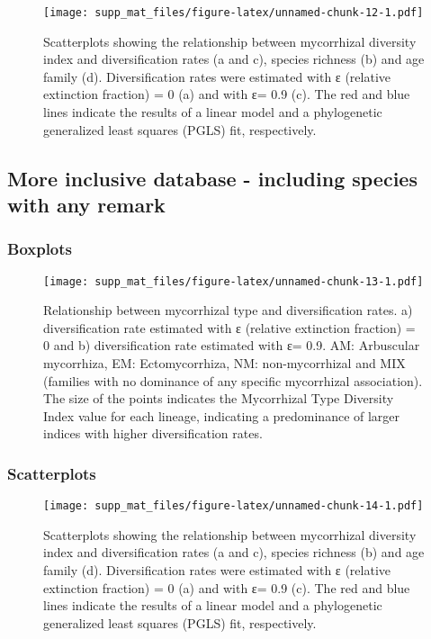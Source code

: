 \documentclass[]{article}
\begin{document}
\begin{figure}
\centering
\texttt{[image: supp\_mat\_files/figure-latex/unnamed-chunk-12-1.pdf]}
\caption{Scatterplots showing the relationship between mycorrhizal
diversity index and diversification rates (a and c), species richness
(b) and age family (d). Diversification rates were estimated with ε
(relative extinction fraction) = 0 (a) and with ε= 0.9 (c). The red and
blue lines indicate the results of a linear model and a phylogenetic
generalized least squares (PGLS) fit, respectively.}
\end{figure}

\hypertarget{more-inclusive-database---including-species-with-any-remark}{%
\subsection{More inclusive database - including species with any
remark}\label{more-inclusive-database---including-species-with-any-remark}}

\hypertarget{boxplots-2}{%
\subsubsection{Boxplots}\label{boxplots-2}}

\begin{figure}
\centering
\texttt{[image: supp\_mat\_files/figure-latex/unnamed-chunk-13-1.pdf]}
\caption{Relationship between mycorrhizal type and diversification
rates. a) diversification rate estimated with ε (relative extinction
fraction) = 0 and b) diversification rate estimated with ε= 0.9. AM:
Arbuscular mycorrhiza, EM: Ectomycorrhiza, NM: non-mycorrhizal and MIX
(families with no dominance of any specific mycorrhizal association).
The size of the points indicates the Mycorrhizal Type Diversity Index
value for each lineage, indicating a predominance of larger indices with
higher diversification rates.}
\end{figure}

\hypertarget{scatterplots-2}{%
\subsubsection{Scatterplots}\label{scatterplots-2}}

\begin{figure}
\centering
\texttt{[image: supp\_mat\_files/figure-latex/unnamed-chunk-14-1.pdf]}
\caption{Scatterplots showing the relationship between mycorrhizal
diversity index and diversification rates (a and c), species richness
(b) and age family (d). Diversification rates were estimated with ε
(relative extinction fraction) = 0 (a) and with ε= 0.9 (c). The red and
blue lines indicate the results of a linear model and a phylogenetic
generalized least squares (PGLS) fit, respectively.}
\end{figure}
\end{document}
